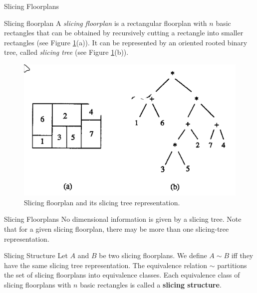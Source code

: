 \documentclass[xcolor=pdftex,dvipsnames,table]{beamer}
\begin{document}
\begin{frame}{Slicing Floorplans}
  \begin{block}{Slicing floorplan}
    A \textit{slicing floorplan} is a rectangular floorplan with $n$ basic rectangles that can be obtained by recursively cutting a rectangle into smaller rectangles (see Figure \ref{fig:1}(a)). It can be represented by an oriented rooted binary tree, called \textit{slicing tree} (see Figure \ref{fig:1}(b)).
  \end{block}
  \begin{figure}
    \includegraphics[trim={0 0 0 0.5cm}, scale=0.3, clip]{slicing_floorplan}
    \caption{Slicing floorplan and its slicing tree representation.}
    \label{fig:1}
  \end{figure}
\end{frame}

\begin{frame}{Slicing Floorplans}
  No dimensional information is given by a slicing tree.
  Note that for a given slicing floorplan, there may be more than one slicing-tree representation.
  \begin{block}{Slicing Structure}
    Let $A$ and $B$ be two slicing floorplans. We define $A \sim B$ iff they have the same slicing tree representation. The equivalence relation $\sim$ partitions the set of slicing floorplans into equivalence classes. Each equivalence class of slicing floorplans with $n$ basic rectangles is called a \textbf{slicing structure}.
  \end{block}
\end{frame}
\end{document}
